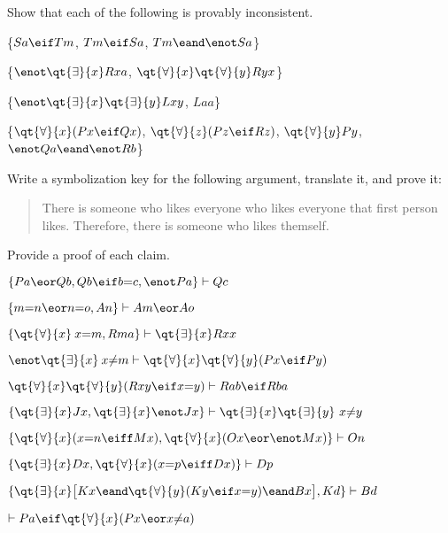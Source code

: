 \problempart
Show that each of the following is provably inconsistent.
\begin{earg}
\item \{$Sa\eif Tm$, $Tm \eif Sa$, $Tm \eand \enot Sa$\}
\item \{$\enot\qt{\exists}{x} Rxa$, $\qt{\forall}{x} \qt{\forall}{y} Ryx$\}
\item \{$\enot\qt{\exists}{x} \qt{\exists}{y} Lxy$, $Laa$\}
\item \{$\qt{\forall}{x}(Px \eif Qx)$, $\qt{\forall}{z}(Pz \eif Rz)$, $\qt{\forall}{y} Py$, $\enot Qa \eand \enot Rb$\}
\end{earg}



\solutions
\problempart
\label{pr.likes}
Write a symbolization key for the following argument, translate it, and prove it:
\begin{quote}
There is someone who likes everyone who likes everyone that first person likes. Therefore, there is someone who likes themself.
\end{quote}

\problempart
\label{pr.identity}
Provide a proof of each claim.
\begin{earg}
\item $\{Pa \eor Qb, Qb \eif b{=}c, \enot Pa\}\vdash Qc$
\item $\{m{=}n \eor n{=}o, An\}\vdash Am \eor Ao$
\item $\{\qt{\forall}{x} \: x{=}m, Rma\}\vdash \qt{\exists}{x} Rxx$
\item $\enot \qt{\exists}{x} \: x {\neq} m \vdash \qt{\forall}{x}\qt{\forall}{y} (Px \eif Py)$
\item $\qt{\forall}{x}\qt{\forall}{y}(Rxy \eif x{=}y)\vdash Rab \eif Rba$
\item $\{\qt{\exists}{x} Jx, \qt{\exists}{x} \enot Jx\}\vdash \qt{\exists}{x} \qt{\exists}{y}\ x{\neq} y$
\item $\{\qt{\forall}{x}(x{=}n \eiff Mx), \qt{\forall}{x}(Ox \eor \enot Mx)\}\vdash On$
\item $\{\qt{\exists}{x} Dx, \qt{\forall}{x}(x{=}p \eiff Dx)\}\vdash Dp$
\item $\{\qt{\exists}{x}\bigl[Kx \eand \qt{\forall}{y}(Ky \eif x{=}y) \eand Bx\bigr], Kd\}\vdash Bd$
\item $\vdash Pa \eif \qt{\forall}{x}(Px \eor x {\neq} a)$
\end{earg}



